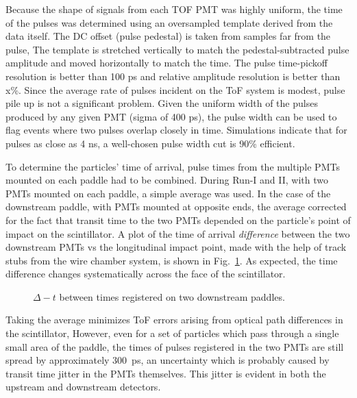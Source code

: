 Because the shape of signals from each TOF PMT was highly uniform, the time of the pulses was determined using an oversampled template derived from the data itself. The DC offset (pulse pedestal) is taken from samples far from the pulse, The template is stretched vertically to match the pedestal-subtracted pulse amplitude and moved horizontally to match the time. The pulse time-pickoff resolution is better than 100 ps and relative amplitude resolution is better than x\%. Since the average rate of pulses incident on the ToF system is modest, pulse pile up is not a significant problem. Given the uniform width of the pulses produced by any given PMT (sigma of 400 ps), the pulse width can be used to flag events where two pulses overlap closely in time. Simulations indicate that for pulses as close as 4 ns, a well-chosen pulse width cut is 90\% efficient.

To determine the particles' time of arrival, pulse times from the multiple PMTs mounted on each paddle had to be combined. During Run-I and II, with two PMTs mounted on each paddle, a simple average was used. In the case of the downstream paddle, with PMTs mounted at opposite ends, the average corrected for the fact that transit time to the two PMTs depended on the particle's point of impact on the scintillator. A plot of the time of arrival {\it difference} between the two downstream PMTs vs the longitudinal impact point, made with the help of track stubs from the wire chamber system, is shown in Fig.~\ref{fig:tofdelay}. As expected, the time difference
changes systematically across the face of the scintillator.

\begin{figure}[!h]
\begin{centering}
\vspace{-0.3cm}
\caption{
{\scriptsize \sf $\Delta-t$ between times registered on two downstream paddles.}
}
\label{fig:tofdelay}
\end{centering}
\end{figure}

Taking the average minimizes ToF errors arising from optical path differences in the scintillator, However, even for a set of particles which pass through a single small area of the paddle, the times of pulses registered in the two PMTs are still spread by approximately 300~ps, an uncertainty which is probably caused by transit time jitter in the PMTs themselves. This jitter is evident in both the upstream and downstream detectors.

